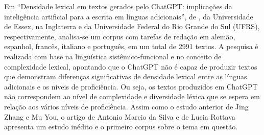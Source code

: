 \documentclass[portuguese]{textolivre}
\begin{document}
Em “Densidade lexical em textos gerados pelo ChatGPT: implicações da inteligência artificial para a escrita em línguas adicionais”, de \textcite{silva_densidade_2024}, da Universidade de Essex, na Inglaterra e da Universidade Federal do Rio Grande do Sul (UFRS), respectivamente, analisa-se um corpus com tarefas de redação em alemão, espanhol, francês, italiano e português, em um total de 2991 textos. A pesquisa é realizada com base na linguística sistêmico-funcional e no conceito de complexidade lexical, apontando que o ChatGPT não é capaz de produzir textos que demonstram diferenças significativas de densidade lexical entre as línguas adicionais e os níveis de proficiência. Ou seja, os textos produzidos em ChatGPT não correspondem ao nível de complexidade e diversidade léxica que se espera em relação aos vários níveis de proficiência. Assim como o estudo anterior de Jing Zhang e Mu You, o artigo de Antonio Marcio da Silva e de Lucia Rottava apresenta um estudo inédito e o primeiro corpus sobre o tema em questão.   
\end{document}
